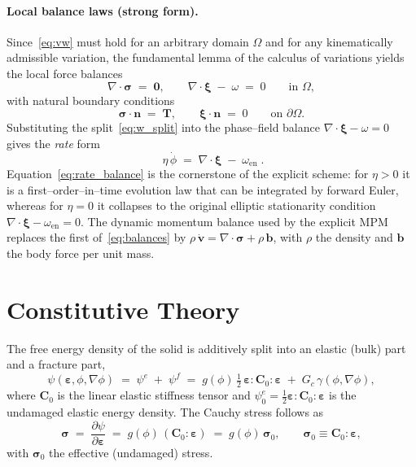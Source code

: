 \documentclass[12pt,a4paper]{article}
\newcommand{\bsig}{\boldsymbol{\sigma}}
\newcommand{\beps}{\boldsymbol{\varepsilon}}
\newcommand{\bxi}{\boldsymbol{\xi}}
\newcommand{\bv}{\mathbf{v}}
\newcommand{\bb}{\mathbf{b}}
\newcommand{\bn}{\mathbf{n}}
\newcommand{\bT}{\mathbf{T}}
\newcommand{\Cz}{\mathbf{C}_0}
\begin{document}
	\paragraph{Local balance laws (strong form).}
	Since~\eqref{eq:vw} must hold for an arbitrary domain $\Omega$ and for any
	kinematically admissible variation, the fundamental lemma of the calculus of
	variations yields the local force balances
	\begin{equation}\label{eq:balances}
		\nabla\cdot\bsig \;=\; \mathbf{0},
		\qquad
		\nabla\cdot\bxi \;-\; \omega \;=\; 0
		\qquad\text{in }\Omega,
	\end{equation}
	with natural boundary conditions
	\begin{equation}\label{eq:bcs}
		\bsig\cdot\bn \;=\; \bT,
		\qquad
		\bxi\cdot\bn \;=\; 0
		\qquad\text{on }\partial\Omega.
	\end{equation}
	Substituting the split~\eqref{eq:w_split} into the phase--field balance
	$\nabla\cdot\bxi-\omega=0$ gives the \emph{rate} form
	\begin{equation}\label{eq:rate_balance}
		\boxed{\;\eta\,\dot{\phi} \;=\; \nabla\cdot\bxi \;-\; \omega_{\mathrm{en}}\;.}
	\end{equation}
	Equation~\eqref{eq:rate_balance} is the cornerstone of the explicit scheme:
	for $\eta>0$ it is a first--order--in--time evolution law that can be
	integrated by forward Euler, whereas for $\eta=0$ it collapses to the original
	elliptic stationarity condition $\nabla\cdot\bxi-\omega_{\mathrm{en}}=0$.
	The dynamic momentum balance used by the explicit MPM replaces the first
	of~\eqref{eq:balances} by $\rho\,\dot{\bv}=\nabla\cdot\bsig+\rho\,\bb$, with
	$\rho$ the density and $\bb$ the body force per unit mass.

	\section{Constitutive Theory}\label{sec:const}

	The free energy density of the solid is additively split into an elastic
	(bulk) part and a fracture part,
	\begin{equation}\label{eq:psi}
		\psi(\beps,\phi,\nabla\phi) \;=\; \psi^e \;+\; \psi^f
		\;=\; g(\phi)\,\tfrac{1}{2}\,\beps:\Cz:\beps \;+\; G_c\,\gamma(\phi,\nabla\phi),
	\end{equation}
	where $\Cz$ is the linear elastic stiffness tensor and
	$\psi^e_0=\tfrac{1}{2}\beps:\Cz:\beps$ is the undamaged elastic energy
	density. The Cauchy stress follows as
	\begin{equation}\label{eq:cauchy}
		\bsig \;=\; \frac{\partial\psi}{\partial\beps} \;=\; g(\phi)\,(\Cz:\beps) \;=\; g(\phi)\,\bsig_0,
		\qquad \bsig_0 \equiv \Cz:\beps ,
	\end{equation}
	with $\bsig_0$ the effective (undamaged) stress.
\end{document}
